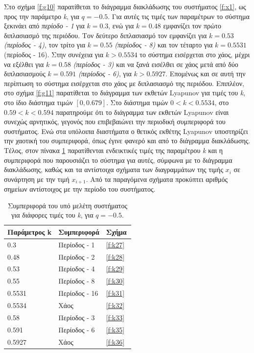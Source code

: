 Στο σχήμα \ref{f:g10} παρατίθεται το διάγραμμα διακλάδωσης του συστήματος \ref{f:x1}, ως προς την παράμετρο \emph{k}, για $q =- 0.5$. Για αυτές τις τιμές των παραμέτρων το σύστημα ξεκινάει από \emph{περίοδο - 1} για $k=0.3$, ενώ για  $k=0.48$ εμφανίζει τον πρώτο διπλασιασμό της περιόδου. Τον δεύτερο διπλασιασμό τον εμφανίζει για $k=0.53$ \emph{(περίοδος -   4)}, τον τρίτο για $k=0.55$ \emph{\emph{(περίοδος -   8)}} και τον τέταρτο για $k=0.5531$ (περίοδος - 16). Στην συνέχεια για $k>0.5534$ το σύστημα εισέρχεται στο χάος, μέχρι να εξέλθει  για $k=0.58$ \emph{(περίοδος -   3)} και να ξανά εισέλθει σε χάος μετά από δύο διπλασιασμούς $k=0.591$ \emph{(περίοδος -   6)}, για $k>0.5927$.
Επομένως και σε αυτή την περίπτωση το σύστημα εισέρχεται στο χάος με διπλασιασμό της περιόδου. 
Επιπλέον, στο σχήμα \ref{f:g11} παρατίθεται το διάγραμμα των εκθετών Lyapunov για τιμές του \emph{k}, στο ίδιο διάστημα τιμών $[0, 0.679]$.  Στο διάστημα τιμών $0<k<0.5534$, στο $0.59<k<0.594$ παρατηρούμε ότι το διάγραμμα των εκθετών Lyapunov είναι συνεχώς αρνητικός, γεγονός που επιβεβαιώνει την περιοδική συμπεριφορά του συστήματος. Ενώ στα υπόλοιπα διαστήματα ο θετικός εκθέτης Lyapunov υποστηρίζει την χαοτική του συμπεριφορά, όπως έγινε φανερό και από το διάγραμμα διακλάδωσης.
Τέλος, στον πίνακα \ref{tab:abc2} παρατίθενται ενδεικτικές τιμές της παραμέτρου \emph{k} και η συμπεριφορά που παρουσιάζει το σύστημα για αυτές, σύμφωνα με το διάγραμμα διακλάδωσης, καθώς και τα αντίστοιχα σχήματα των διαγραμμάτων της τιμής \(x_i\) σε συνάρτηση με την τιμή \(x_{i+1}\). Από τα παραγόμενα σχήματα προκύπτει αριθμός σημείων αντίστοιχος με την περίοδο του συστήματος.

\begin{table}[h!]
	\centering
	\caption{ Συμπεριφορά του υπό μελέτη συστήματος για διάφορες τιμές του \emph{k}, για $q=-0.5$.}
	\label{tab:abc2}
	\begin{tabular}{l | l | l}
		Παράμετρος k & Συμπεριφορά & Σχήμα\\
		\hline
		0.3 &  Περίοδος -  1 & \ref{f:k27}\\
		0.48& Περίοδος -  2 & \ref{f:k28}\\
		0.53& Περίοδος -  4 & \ref{f:k29}\\
		0.55 &  Περίοδος -  8 & \ref{f:k30}\\
		0.5531 & Περίοδος -  16& \ref{f:k31}\ \\
		0.5534 & Χάος & \ref{f:k32}\\
		0.58 & Περίοδος -  3 & \ref{f:k33}\\
		0.591 & Περίοδος -  6 & \ref{f:k35}\\
		0.5927 & Χάος & \ref{f:k36}\\
	\end{tabular}
	
\end{table}

